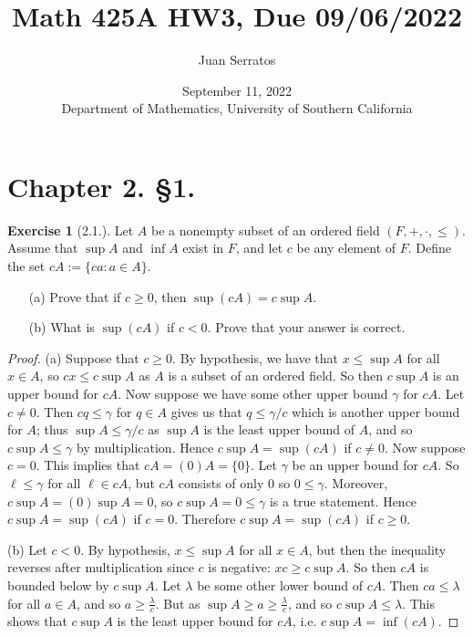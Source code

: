 \documentclass[9pt,reqno]{amsart}
\title{Math 425A HW3, Due 09/06/2022}
\author{Juan Serratos}
\date{ September 11, 2022 \\ {Department of Mathematics, University of Southern California}}
\theoremstyle{definition}
\newtheorem{exercise}{Exercise}[section]
\begin{document}
\maketitle
\setcounter{tocdepth}{4}
\setcounter{secnumdepth}{4}

\section*{Chapter 2. \S 1.}
\begin{exercise}[2.1.]
	Let $A$ be a nonempty subset of an ordered field $(F, +, \cdot, \leq )$. Assume that $\sup A$ and $\inf A$ exist in $F$, and let $c$ be any element of $F$. Define the set $cA := \{ca \colon a \in A \}$.
	\begin{itemize}
		\item [(a)] Prove that if $c \geq 0 $, then $\sup (cA) = c \sup A$.
		\item [(b)] What is $\sup (cA)$ if $c < 0$. Prove that your answer is correct.
	\end{itemize}
\end{exercise}
\begin{proof}
	(a) Suppose that $c \geq 0$. By hypothesis, we have that $x \leq \sup A$ for all $x \in A$, so $cx \leq c \sup A$ as $A$ is a subset of an ordered field. So then $c\sup A$ is an upper bound for $cA$. Now suppose we have some other upper bound $\gamma$ for $cA$. Let $c \neq 0$. Then $c q \leq \gamma$ for $q \in A$ gives us that $q \leq \gamma/c$ which is another upper bound for $A$; thus $\sup A \leq \gamma /c$ as $\sup A$ is the least upper bound of $A$, and so $c \sup A \leq \gamma$ by multiplication. Hence $ c \sup A = \sup (cA)$ if $c \neq 0$. Now suppose $c = 0$. This implies that $c A = (0) A = \{ 0 \}$. Let $\gamma$ be an upper bound for $cA$. So $\ell \leq \gamma$ for all $\ell \in cA$, but $cA$ consists of only $0$ so $0 \leq \gamma$. Moreover, $c \sup A = (0) \sup A = 0$, so $c \sup A = 0 \leq \gamma$ is a true statement. Hence $c \sup A = \sup (cA)$ if $c = 0$. Therefore $c \sup A = \sup (cA)$ if $c \geq 0$.
	
	(b) Let $c < 0$. By hypothesis, $x \leq \sup A$ for all $x \in A$, but then the inequality reverses after multiplication since $c$ is negative: $x c \geq c \sup A$. So then $cA$ is bounded below by $c \sup A$. Let $\lambda $ be some other lower bound of $cA$. Then $ca \leq \lambda$ for all $a \in A$, and so $a \geq \frac{\lambda}{c}$. But as $\sup A \geq a \geq \frac{\lambda}{c}$, and so $c \sup A \leq \lambda$. This shows that $c \sup A$ is the least upper bound for $cA$, i.e. $c \sup A = \inf(cA)$. 
	\end{proof}
\end{document}
